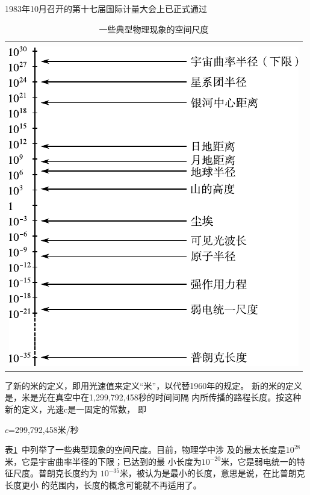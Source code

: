 \renewcommand{\hsp}{\hspace{0.6em}}
1983\hsp 年\hsp 10\hsp 月召开的第十七届国际计量大会上已正式通过
\\
\begin{table}[!h]
    \centering
    \vspace{-0.5em}
    \caption{一些典型物理现象的空间尺度}
    \label{tab:01.03}
    \begin{tabular}{c}
        \toprule \vspace{-1em} \\
        \includegraphics{figure/tab01.03.pdf}\\
        \bottomrule
    \end{tabular}
    \vspace{-1.2em}
\end{table}
\clearpage
\noindent 了新的米的定义，即用光速值来定义“米”，以代替1960年的规定。
新的米的定义是，米是光在真空中在1,299,792,458秒的时间间隔
内所传播的路程长度。按这种新的定义，光速c是一固定的常数，
即

\centerline{$c$=299,792,458米/秒}

表\ref{tab:01.03}~中列举了一些典型现象的空间尺度。目前，物理学中涉
及的最太长度是$10^{28}$米，它是宇宙曲率半径的下限；已达到的最
小长度为$10^{-20}$米，它是弱电统一的特征尺度。普朗克长度约为
$10^{-35}$米，被认为是最小的长度，意思是说，在比普朗克长度更小
的范围内，长度的概念可能就不再适用了。
